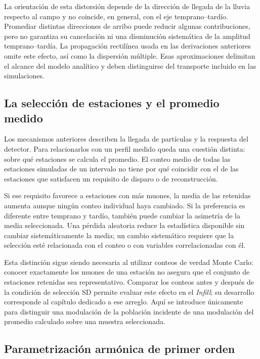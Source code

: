 La orientación de esta distorsión depende de la dirección de llegada de la lluvia respecto al campo y no coincide, en general, con el eje temprano--tardío. Promediar distintas direcciones de arribo puede reducir algunas contribuciones, pero no garantiza su cancelación ni una disminución sistemática de la amplitud temprano--tardía. La propagación rectilínea usada en las derivaciones anteriores omite este efecto, así como la dispersión múltiple. Esas aproximaciones delimitan el alcance del modelo analítico y deben distinguirse del transporte incluido en las simulaciones.

\subsection{La selección de estaciones y el promedio medido}
\label{subsec:respuesta_seleccion}

Los mecanismos anteriores describen la llegada de partículas y la respuesta del detector. Para relacionarlos con un perfil medido queda una cuestión distinta: sobre qué estaciones se calcula el promedio. El conteo medio de todas las estaciones simuladas de un intervalo no tiene por qué coincidir con el de las estaciones que satisfacen un requisito de disparo o de reconstrucción.

Si ese requisito favorece a estaciones con más muones, la media de las retenidas aumenta aunque ningún conteo individual haya cambiado. Si la preferencia es diferente entre temprano y tardío, también puede cambiar la asimetría de la media seleccionada. Una pérdida aleatoria reduce la estadística disponible sin cambiar sistemáticamente la media; un cambio sistemático requiere que la selección esté relacionada con el conteo o con variables correlacionadas con él.

Esta distinción sigue siendo necesaria al utilizar conteos de verdad Monte Carlo: conocer exactamente los muones de una estación no asegura que el conjunto de estaciones retenidas sea representativo. Comparar los conteos antes y después de la condición de selección SD permite evaluar este efecto en el \textit{Infill}; su desarrollo corresponde al capítulo dedicado a ese arreglo. Aquí se introduce únicamente para distinguir una modulación de la población incidente de una modulación del promedio calculado sobre una muestra seleccionada.

\subsection{Parametrización armónica de primer orden}
\label{subsec:parametrizacion}

